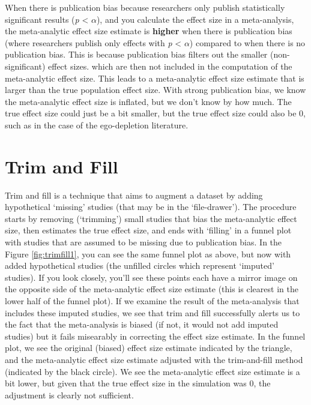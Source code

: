 \documentclass[
  oneside]{book}
\begin{document}
When there is publication bias because researchers only publish statistically significant results (\emph{p} \textless{} \(\alpha\)), and you calculate the effect size in a meta-analysis, the meta-analytic effect size estimate is \textbf{higher} when there is publication bias (where researchers publish only effects with \emph{p} \textless{} \(\alpha\)) compared to when there is no publication bias. This is because publication bias filters out the smaller (non-significant) effect sizes. which are then not included in the computation of the meta-analytic effect size. This leads to a meta-analytic effect size estimate that is larger than the true population effect size. With strong publication bias, we know the meta-analytic effect size is inflated, but we don't know by how much. The true effect size could just be a bit smaller, but the true effect size could also be 0, such as in the case of the ego-depletion literature.

\hypertarget{trim-and-fill}{%
\section{Trim and Fill}\label{trim-and-fill}}

Trim and fill is a technique that aims to augment a dataset by adding hypothetical `missing' studies (that may be in the `file-drawer'). The procedure starts by removing (`trimming') small studies that bias the meta-analytic effect size, then estimates the true effect size, and ends with `filling' in a funnel plot with studies that are assumed to be missing due to publication bias. In the Figure \ref{fig:trimfill1}, you can see the same funnel plot as above, but now with added hypothetical studies (the unfilled circles which represent `imputed' studies). If you look closely, you'll see these points each have a mirror image on the opposite side of the meta-analytic effect size estimate (this is clearest in the lower half of the funnel plot). If we examine the result of the meta-analysis that includes these imputed studies, we see that trim and fill successfully alerts us to the fact that the meta-analysis is biased (if not, it would not add imputed studies) but it fails misearably in correcting the effect size estimate. In the funnel plot, we see the original (biased) effect size estimate indicated by the triangle, and the meta-analytic effect size estimate adjusted with the trim-and-fill method (indicated by the black circle). We see the meta-analytic effect size estimate is a bit lower, but given that the true effect size in the simulation was 0, the adjustment is clearly not sufficient.
\end{document}
